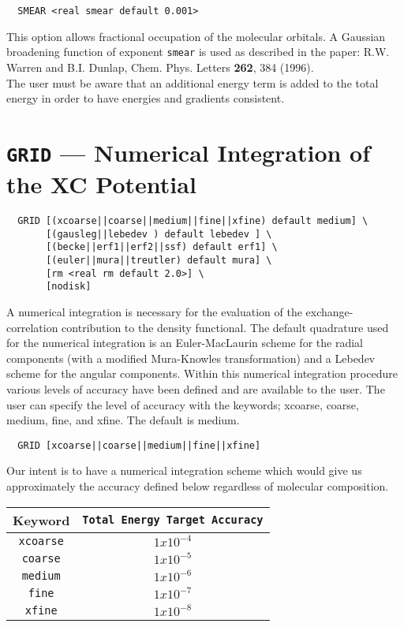 \begin{verbatim}
  SMEAR <real smear default 0.001>
\end{verbatim}

This  option allows fractional occupation of the molecular orbitals.
A Gaussian broadening function of exponent {\tt smear} is used as described in 
the paper:
R.W. Warren and B.I. Dunlap, Chem. Phys. Letters {\bf 262}, 384 (1996).\\
The user must be aware that an additional energy term is added to the total
energy in order to have
energies and gradients consistent.


\section{{\tt GRID} --- Numerical Integration of the XC Potential}
\label{grgrid}
\begin{verbatim}
  GRID [(xcoarse||coarse||medium||fine||xfine) default medium] \
       [(gausleg||lebedev ) default lebedev ] \
       [(becke||erf1||erf2||ssf) default erf1] \
       [(euler||mura||treutler) default mura] \
       [rm <real rm default 2.0>] \
       [nodisk]
\end{verbatim}

A numerical integration is necessary for the evaluation of the
exchange-correlation contribution to the density functional.  The
default quadrature used for the numerical integration is an
Euler-MacLaurin scheme for the radial components (with a modified
Mura-Knowles transformation)
and a Lebedev
scheme for the angular components.  Within this numerical
integration procedure various levels of accuracy have been defined and
are available to the user.  The user can specify the level of accuracy
with the keywords; xcoarse, coarse, medium, fine, and xfine.  The
default is medium.

\begin{verbatim}
  GRID [xcoarse||coarse||medium||fine||xfine]
\end{verbatim}

Our intent is to have a numerical integration scheme which would give
us approximately the accuracy defined below regardless of molecular
composition.  
\begin{center}
  \begin{tabular}[right]{|c|c|} \hline
Keyword & {\tt Total Energy Target Accuracy} \\ \hline
{\tt xcoarse} & $1x10^{-4}$ \\ \hline
{\tt coarse}  & $1x10^{-5}$ \\ \hline
{\tt medium}  & $1x10^{-6}$ \\ \hline
{\tt fine}    & $1x10^{-7}$ \\ \hline
{\tt xfine}   & $1x10^{-8}$ \\ \hline
  \end{tabular} \\
\end{center}

